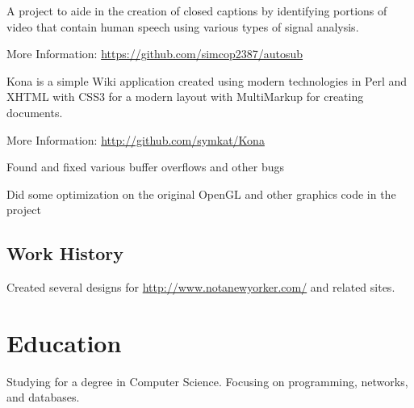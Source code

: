 \documentclass[table,tmargin=1in,bmargin=1in,letterpaper]{resume}
\begin{document}

\begin{compactitem}
\item A project to aide in the creation of closed captions by identifying portions of 
video that contain human speech using various types of signal analysis.
\item More Information: \url{https://github.com/simcop2387/autosub}
\end{compactitem}


\begin{compactitem}
\item Kona is a simple Wiki application created using modern technologies in Perl and XHTML 
with CSS3 for a modern layout with MultiMarkup for creating documents.
\item More Information: \url{http://github.com/symkat/Kona}
\end{compactitem}


\begin{compactitem}
\item Found and fixed various buffer overflows and other bugs
\item Did some optimization on the original OpenGL and other graphics code in the project
\end{compactitem}

\subsection{Work History}

\begin{compactitem}
\item Created several designs for \url{http://www.notanewyorker.com/} and related sites.
\end{compactitem}

\section{Education}

\begin{compactitem}
\item Studying for a degree in Computer Science.  Focusing on programming, networks, and databases.
\end{compactitem}
\end{document}

